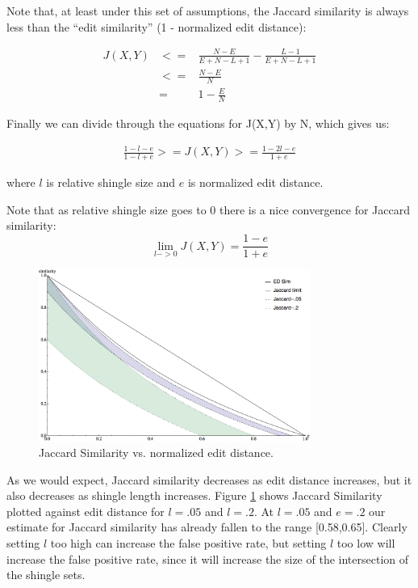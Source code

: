 \documentclass{acm_proc_article-sp}
\begin{document}
Note that, at least under this set of assumptions, the Jaccard similarity is always less than the ``edit similarity'' (1 - normalized edit distance):

\begin{eqnarray*}
J(X,Y) & <= & \frac{N - E}{E + N - L + 1} - \frac{L - 1}{E + N - L + 1} \\
       & <= & \frac{N - E}{N} \\ 
       & =  & 1 - \frac{E}{N}
\end{eqnarray*}

Finally we can divide through the equations for J(X,Y) by N, which gives us:

\begin{eqnarray*}
\frac{1 - l - e}{1 - l + e} >= J(X,Y) >= \frac{1 - 2l - e}{1 + e}
\end{eqnarray*}

where $l$ is relative shingle size and $e$ is normalized edit distance.

Note that as relative shingle size goes to 0 there is a nice convergence for Jaccard similarity:
\[\lim_{l->0}J(X,Y) = \frac{1 - e}{1 + e}\]

\begin{figure}
\centering
\includegraphics[width=3.5in, keepaspectratio = true]{jac-ed-chart.png}
\caption{Jaccard Similarity vs. normalized edit distance.}
\label{jac-ed}
\end{figure}

As we would expect, Jaccard similarity decreases as edit distance increases, but it also decreases as shingle length increases. Figure \ref{jac-ed} shows Jaccard Similarity plotted against edit distance for $l = .05$ and $l = .2$. At $l = .05$ and $e = .2$ our estimate for Jaccard similarity has already fallen to the range [0.58,0.65]. Clearly setting $l$ too high can increase the false positive rate, but setting $l$ too low will increase the false positive rate, since it will increase the size of the intersection of the shingle sets.
\end{document}
